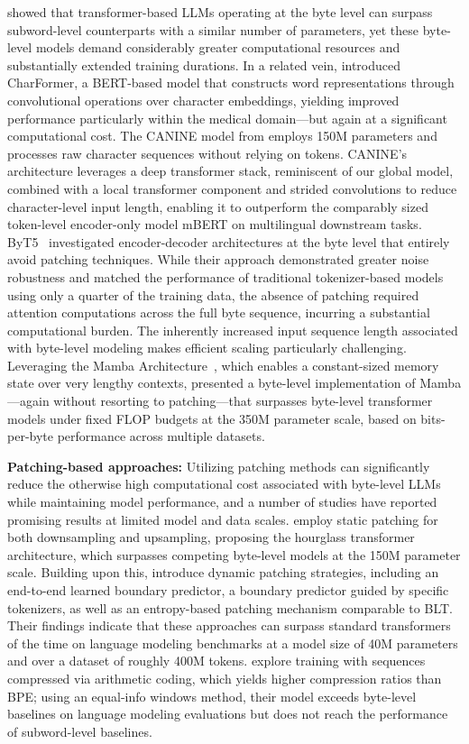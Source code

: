 \cite{Choe2019BridgingTG} showed that transformer-based LLMs operating at the byte level can surpass subword-level counterparts with a similar number of parameters, yet these byte-level models demand considerably greater computational resources and substantially extended training durations. In a related vein, \cite{el2020characterbert} introduced CharFormer, a BERT-based model that constructs word representations through convolutional operations over character embeddings, yielding improved performance particularly within the medical domain—but again at a significant computational cost. The CANINE model from \cite{clark2022canine} employs 150M parameters and processes raw character sequences without relying on tokens. CANINE’s architecture leverages a deep transformer stack, reminiscent of our global model, combined with a local transformer component and strided convolutions to reduce character-level input length, enabling it to outperform the comparably sized token-level encoder-only model mBERT on multilingual downstream tasks. ByT5~\citep{xue2022byt5} investigated encoder-decoder architectures at the byte level that entirely avoid patching techniques. While their approach demonstrated greater noise robustness and matched the performance of traditional tokenizer-based models using only a quarter of the training data, the absence of patching required attention computations across the full byte sequence, incurring a substantial computational burden. The inherently increased input sequence length associated with byte-level modeling makes efficient scaling particularly challenging. Leveraging the Mamba Architecture~\citep{gu2023mamba}, which enables a constant-sized memory state over very lengthy contexts, \cite{wang2024mambabyte} presented a byte-level implementation of Mamba—again without resorting to patching—that surpasses byte-level transformer models under fixed FLOP budgets at the 350M parameter scale, based on bits-per-byte performance across multiple datasets.

\textbf{Patching-based approaches:} Utilizing patching methods can significantly reduce the otherwise high computational cost associated with byte-level LLMs while maintaining model performance, and a number of studies have reported promising results at limited model and data scales. \cite{nawrot-etal-2022-hierarchical} employ static patching for both downsampling and upsampling, proposing the hourglass transformer architecture, which surpasses competing byte-level models at the 150M parameter scale. Building upon this, \cite{nawrot-etal-2023-efficient} introduce dynamic patching strategies, including an end-to-end learned boundary predictor, a boundary predictor guided by specific tokenizers, as well as an entropy-based patching mechanism comparable to {\textsc BLT}. Their findings indicate that these approaches can surpass standard transformers of the time on language modeling benchmarks at a model size of 40M parameters and over a dataset of roughly 400M tokens. \cite{lester2024training} explore training with sequences compressed via arithmetic coding, which yields higher compression ratios than BPE; using an equal-info windows method, their model exceeds byte-level baselines on language modeling evaluations but does not reach the performance of subword-level baselines.

